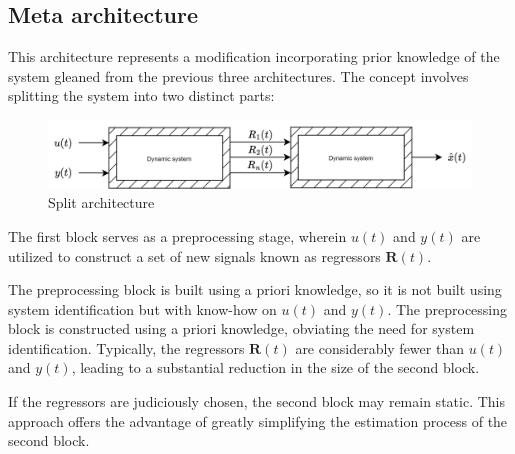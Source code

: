 \subsection{Meta architecture}
This architecture represents a modification incorporating prior knowledge of the system gleaned from the previous three architectures.
The concept involves splitting the system into two distinct parts:
\begin{figure}[H]
    \centering
    \includegraphics[width=0.75\linewidth]{images/reg.png}
    \caption{Split architecture}
\end{figure}
\noindent The first block serves as a preprocessing stage, wherein $u(t)$ and $y(t)$ are utilized to construct a set of new signals known as regressors $\mathbf{R}(t)$. 

The preprocessing block is built using a priori knowledge, so it is not built using system identification but with know-how on $u(t)$ and $y(t)$. 
The preprocessing block is constructed using a priori knowledge, obviating the need for system identification. 
Typically, the regressors $\mathbf{R}(t)$ are considerably fewer than $u(t)$ and $y(t)$, leading to a substantial reduction in the size of the second block.

If the regressors are judiciously chosen, the second block may remain static. 
This approach offers the advantage of greatly simplifying the estimation process of the second block.